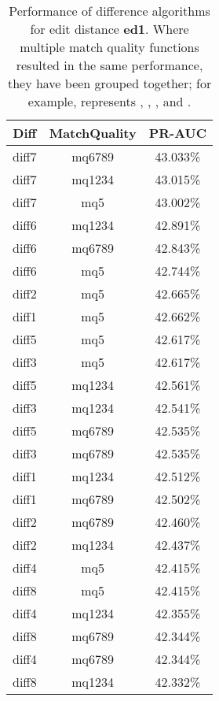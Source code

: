 \begin{table}[tbph]
\begin{center}
\begin{tabular}{|c|c||c|}
\hline
Diff & MatchQuality & PR-AUC  \\
\hline
\hline
diff7 & mq6789 & 43.033\% \\
diff7 & mq1234 & 43.015\% \\
diff7 & mq5 & 43.002\% \\
diff6 & mq1234 & 42.891\% \\
diff6 & mq6789 & 42.843\% \\
diff6 & mq5 & 42.744\% \\
diff2 & mq5 & 42.665\% \\
diff1 & mq5 & 42.662\% \\
diff5 & mq5 & 42.617\% \\
diff3 & mq5 & 42.617\% \\
diff5 & mq1234 & 42.561\% \\
diff3 & mq1234 & 42.541\% \\
diff5 & mq6789 & 42.535\% \\
diff3 & mq6789 & 42.535\% \\
diff1 & mq1234 & 42.512\% \\
diff1 & mq6789 & 42.502\% \\
diff2 & mq6789 & 42.460\% \\
diff2 & mq1234 & 42.437\% \\
diff4 & mq5 & 42.415\% \\
diff8 & mq5 & 42.415\% \\
diff4 & mq1234 & 42.355\% \\
diff8 & mq6789 & 42.344\% \\
diff4 & mq6789 & 42.344\% \\
diff8 & mq1234 & 42.332\% \\
\hline
\end{tabular}
\end{center}
\caption[Comparison of diff algorithms using edit distance \textbf{ed1}]{
  Performance of difference algorithms for
  edit distance \textbf{ed1}.  Where multiple match
  quality functions resulted in the same performance, they
  have been grouped together; for example,  represents
  , , , and .}
\label{tab:editlongbyed1}
\end{table}
